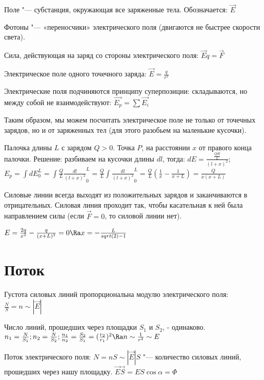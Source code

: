Поле "--- субстанция, окружающая все заряженные тела. Обозначается: $\overrightarrow{E}$

Фотоны "--- «переносчики» электрического поля (двигаются не быстрее скорости света).

Сила, действующая на заряд со стороны электрического поля: $\overrightarrow{E}q = \overrightarrow{F}$

Электрическое поле одного точечного заряда: $\overrightarrow{E} = \frac{q}{r^2}$

Электрические поля подчиняются принципу суперпозиции: складываются, но между собой не взаимодействуют: $\overrightarrow{E_p} = \sum{\overrightarrow{E_i}}$

Таким образом, мы можем посчитать электрическое поле не только от точечных зарядов, но и от заряженных тел (для этого разобьем на маленькие кусочки).

\begin{exmp}
  Палочка длины $L$ с зарядом $Q > 0$. Точка $P$, на расстоянии $x$ от правого конца палочки.
  Решение: разбиваем на кусочки длины $dl$, тогда: $dE = \frac{\frac{Qdl}{L}}{(l + x)^2}$; $E_p = \int{dE}_0^L = \int{\frac{Q}{L}\frac{dl}{(l + x)^2}}_0^L = \frac{Q}{L}\int{\frac{dl}{(l + x)^2}}_0^L  = \frac{Q}{L}(\frac{1}{x} - \frac{1}{x + L}) = \frac{Q}{x(x + L)}$
\end{exmp}


Силовые линии всегда выходят из положительных зарядов и заканчиваются в отрицательных. Силовая линия проходит так, чтобы касательная к ней была направлением силы (если $\overrightarrow{F} = 0$, то силовой линии нет).

\begin{exmp}
 $E = \frac{2q}{x^2} - \frac{q}{(x + L)^2} = 0 \Ra x = - \frac{L}{sqrt(2) - 1}$
\end{exmp}



\section{Поток}
Густота силовых линий пропорциональна модулю электрического поля: $\frac{N}{S} = n \sim |\overrightarrow{E}|$


Число линий, прошедших через площадки $S_1$ и $S_2$, - одинаково. $n_1 = \frac{N}{S_1}; n_2 = \frac{N}{S_2}; \frac{n_1}{n_2} = \frac{S_2}{S_1} = (\frac{r_2}{r_1})^2 \Ra n \sim \frac{1}{r^2} \sim E$


Поток электрического поля: $N = nS \sim |\overrightarrow{E}|S$ "--- количество силовых линий, прошедших через нашу площадку. $\overrightarrow{E}\overrightarrow{S} = ES\cos{\alpha} = \Phi$

